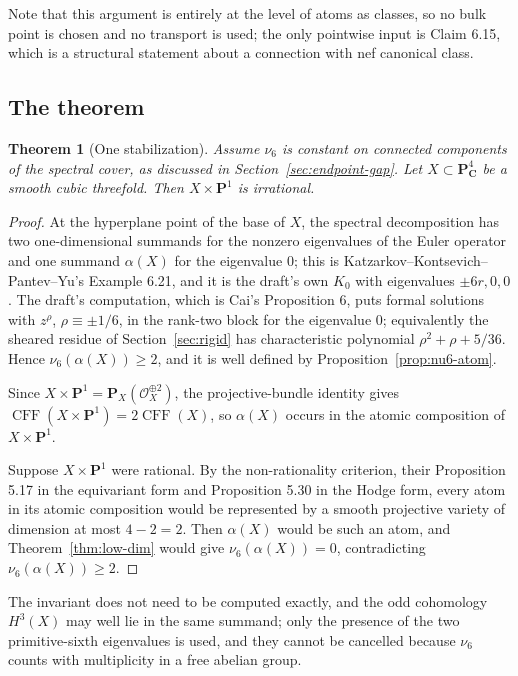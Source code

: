 \documentclass[11pt]{article}
\newtheorem{theorem}{Theorem}
\theoremstyle{definition}
\theoremstyle{remark}
\newcommand{\C}{\mathbf C}
\newcommand{\PP}{\mathbf P}
\begin{document}
Note that this argument is entirely at the level of atoms as classes, so no
bulk point is chosen and no transport is used; the only pointwise input is
Claim 6.15, which is a structural statement about a connection with nef
canonical class.

\subsection*{The theorem}

\begin{theorem}[One stabilization]
\label{thm:endpoint}
Assume $\nu_6$ is constant on connected components of the spectral cover, as
discussed in Section~\ref{sec:endpoint-gap}. Let $X\subset\PP^4_{\C}$ be a
smooth cubic threefold. Then $X\times\PP^1$ is irrational.
\end{theorem}

\begin{proof}
At the hyperplane point of the base of $X$, the spectral decomposition has two
one-dimensional summands for the nonzero eigenvalues of the Euler operator and
one summand $\alpha(X)$ for the eigenvalue $0$; this is
Katzarkov--Kontsevich--Pantev--Yu's Example 6.21, and it is the draft's own
$K_0$ with eigenvalues $\pm6r,0,0$. The draft's computation, which is Cai's
Proposition 6, puts formal solutions with $z^{\rho}$, $\rho\equiv\pm1/6$, in the
rank-two block for the eigenvalue $0$; equivalently the sheared residue of
Section~\ref{sec:rigid} has characteristic polynomial $\rho^2+\rho+5/36$. Hence
$\nu_6(\alpha(X))\ge2$, and it is well defined by
Proposition~\ref{prop:nu6-atom}.

Since $X\times\PP^1=\PP_X(\mathcal O_X^{\oplus2})$, the projective-bundle
identity gives
$\operatorname{CFF}(X\times\PP^1)=2\operatorname{CFF}(X)$, so $\alpha(X)$ occurs
in the atomic composition of $X\times\PP^1$.

Suppose $X\times\PP^1$ were rational. By the non-rationality criterion, their
Proposition 5.17 in the equivariant form and Proposition 5.30 in the Hodge form,
every atom in its atomic composition would be represented by a smooth projective
variety of dimension at most $4-2=2$. Then $\alpha(X)$ would be such an atom,
and Theorem~\ref{thm:low-dim} would give $\nu_6(\alpha(X))=0$, contradicting
$\nu_6(\alpha(X))\ge2$.
\end{proof}

The invariant does not need to be computed exactly, and the odd cohomology
$H^3(X)$ may well lie in the same summand; only the presence of the two
primitive-sixth eigenvalues is used, and they cannot be cancelled because
$\nu_6$ counts with multiplicity in a free abelian group.
\end{document}
